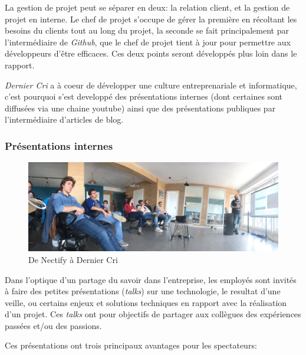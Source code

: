 \documentclass[12pt,a4paper]{article}
\begin{document}
  \bigskip

  La gestion de projet peut se séparer en deux: la relation client, et la
  gestion de projet en interne. Le chef de projet s'occupe de gérer la
  première en récoltant les besoins du clients tout au long du projet, la
  seconde se fait principalement par l'intermédiaire de \emph{Github}, que
  le chef de projet tient à jour pour permettre aux développeurs d'être
  efficaces. Ces deux points seront développés plus loin dans le rapport.

  \bigskip

  \emph{Dernier Cri} a à coeur de développer une culture entreprenariale
  et informatique, c'est pourquoi s'est developpé des présentations
  internes (dont certaines sont diffusées via une chaine youtube) ainsi
  que des présentations publiques par l'intermédiaire d'articles de blog.

  \subsubsection{Présentations internes}\label{pruxe9sentations-internes}

  \begin{figure}[h]
    \centering
    \includegraphics[height=4cm]{figures/talk.jpg}
    \caption{De Nectify à Dernier Cri}
  \end{figure}

  \bigskip

  Dans l'optique d'un partage du savoir dans l'entreprise, les employés
  sont invités à faire des petites présentations (\emph{talks}) sur une
  technologie, le resultat d'une veille, ou certains enjeux et solutions
  techniques en rapport avec la réalisation d'un projet. Ces \emph{talks}
  ont pour objectifs de partager aux collègues des expériences passées
  et/ou des passions.

  \bigskip

  Ces présentations ont trois principaux avantages pour les spectateurs:
\end{document}

